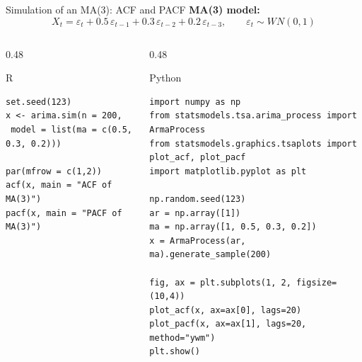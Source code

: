 \documentclass[aspectratio=169]{beamer}
\begin{document}
\begin{frame}[fragile]{Simulation of an MA(3): ACF and PACF}
\small
\textbf{MA(3) model:}
\[
X_t = \varepsilon_t + 0.5\,\varepsilon_{t-1} + 0.3\,\varepsilon_{t-2} + 0.2\,\varepsilon_{t-3},
\qquad \varepsilon_t \sim WN(0,1)
\]
\begin{columns}[T]
\begin{column}{0.48\textwidth}
\begin{block}{R}
\begin{verbatim}
set.seed(123)
x <- arima.sim(n = 200,
 model = list(ma = c(0.5, 0.3, 0.2)))

par(mfrow = c(1,2))
acf(x, main = "ACF of MA(3)")
pacf(x, main = "PACF of MA(3)")
\end{verbatim}
\end{block}
\end{column}

\begin{column}{0.48\textwidth}
\begin{block}{Python}
\begin{verbatim}
import numpy as np
from statsmodels.tsa.arima_process import ArmaProcess
from statsmodels.graphics.tsaplots import plot_acf, plot_pacf
import matplotlib.pyplot as plt

np.random.seed(123)
ar = np.array([1])
ma = np.array([1, 0.5, 0.3, 0.2])
x = ArmaProcess(ar, ma).generate_sample(200)

fig, ax = plt.subplots(1, 2, figsize=(10,4))
plot_acf(x, ax=ax[0], lags=20)
plot_pacf(x, ax=ax[1], lags=20, method="ywm")
plt.show()
\end{verbatim}
\end{block}
\end{column}
\end{columns}

\end{frame}
\end{document}
